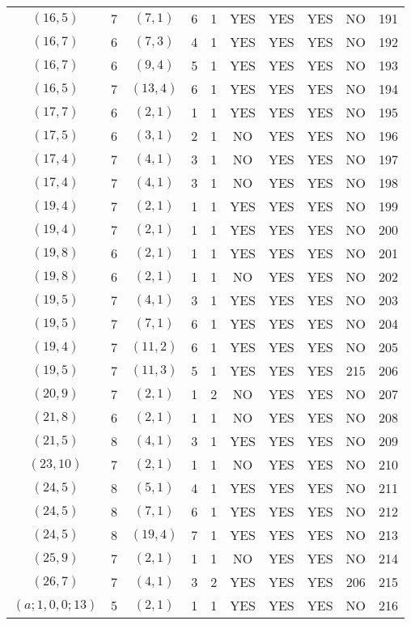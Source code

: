 \begin{longtable}{|c|c|c|c|c|c|c|c|c|c|}
$(16, 5)$ & 7 & $(7, 1)$ & 6 & 1 & YES & YES & YES & NO & 191\\
$(16, 7)$ & 6 & $(7, 3)$ & 4 & 1 & YES & YES & YES & NO & 192\\
$(16, 7)$ & 6 & $(9, 4)$ & 5 & 1 & YES & YES & YES & NO & 193\\
$(16, 5)$ & 7 & $(13, 4)$ & 6 & 1 & YES & YES & YES & NO & 194\\
$(17, 7)$ & 6 & $(2, 1)$ & 1 & 1 & YES & YES & YES & NO & 195\\
$(17, 5)$ & 6 & $(3, 1)$ & 2 & 1 & NO & YES & YES & NO & 196\\
$(17, 4)$ & 7 & $(4, 1)$ & 3 & 1 & NO & YES & YES & NO & 197\\
$(17, 4)$ & 7 & $(4, 1)$ & 3 & 1 & NO & YES & YES & NO & 198\\
$(19, 4)$ & 7 & $(2, 1)$ & 1 & 1 & YES & YES & YES & NO & 199\\
$(19, 4)$ & 7 & $(2, 1)$ & 1 & 1 & YES & YES & YES & NO & 200\\
$(19, 8)$ & 6 & $(2, 1)$ & 1 & 1 & YES & YES & YES & NO & 201\\
$(19, 8)$ & 6 & $(2, 1)$ & 1 & 1 & NO & YES & YES & NO & 202\\
$(19, 5)$ & 7 & $(4, 1)$ & 3 & 1 & YES & YES & YES & NO & 203\\
$(19, 5)$ & 7 & $(7, 1)$ & 6 & 1 & YES & YES & YES & NO & 204\\
$(19, 4)$ & 7 & $(11, 2)$ & 6 & 1 & YES & YES & YES & NO & 205\\
$(19, 5)$ & 7 & $(11, 3)$ & 5 & 1 & YES & YES & YES & 215 & 206\\
$(20, 9)$ & 7 & $(2, 1)$ & 1 & 2 & NO & YES & YES & NO & 207\\
$(21, 8)$ & 6 & $(2, 1)$ & 1 & 1 & NO & YES & YES & NO & 208\\
$(21, 5)$ & 8 & $(4, 1)$ & 3 & 1 & YES & YES & YES & NO & 209\\
$(23, 10)$ & 7 & $(2, 1)$ & 1 & 1 & NO & YES & YES & NO & 210\\
$(24, 5)$ & 8 & $(5, 1)$ & 4 & 1 & YES & YES & YES & NO & 211\\
$(24, 5)$ & 8 & $(7, 1)$ & 6 & 1 & YES & YES & YES & NO & 212\\
$(24, 5)$ & 8 & $(19, 4)$ & 7 & 1 & YES & YES & YES & NO & 213\\
$(25, 9)$ & 7 & $(2, 1)$ & 1 & 1 & NO & YES & YES & NO & 214\\
$(26, 7)$ & 7 & $(4, 1)$ & 3 & 2 & YES & YES & YES & 206 & 215\\
$(a; 1, 0, 0; 13)$ & 5 & $(2, 1)$ & 1 & 1 & YES & YES & YES & NO & 216\\

\end{longtable}
